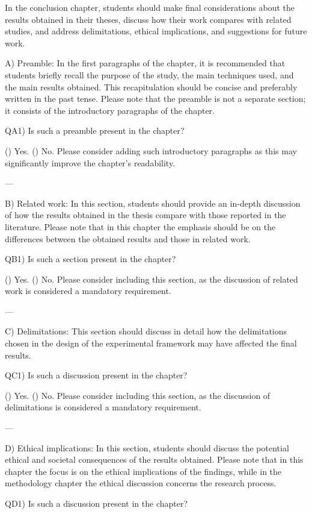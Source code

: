 In the conclusion chapter, students should make final considerations about the results obtained in their theses, discuss how their work compares with related studies, and address delimitations, ethical implications, and suggestions for future work.

A) Preamble: In the first paragraphs of the chapter, it is recommended that students briefly recall the purpose of the study, the main techniques used, and the main results obtained. This recapitulation should be concise and preferably written in the past tense. Please note that the preamble is not a separate section; it consists of the introductory paragraphs of the chapter.

QA1) Is such a preamble present in the chapter?

() Yes.  
() No. Please consider adding such introductory paragraphs as this may significantly improve the chapter's readability.

---

B) Related work: In this section, students should provide an in-depth discussion of how the results obtained in the thesis compare with those reported in the literature. Please note that in this chapter the emphasis should be on the differences between the obtained results and those in related work.

QB1) Is such a section present in the chapter?

() Yes.  
() No. Please consider including this section, as the discussion of related work is considered a mandatory requirement.

---

C) Delimitations: This section should discuss in detail how the delimitations chosen in the design of the experimental framework may have affected the final results. 

QC1) Is such a discussion present in the chapter?

() Yes.  
() No. Please consider including this section, as the discussion of delimitations is considered a mandatory requirement.

---

D) Ethical implications: In this section, students should discuss the potential ethical and societal consequences of the results obtained. Please note that in this chapter the focus is on the ethical implications of the findings, while in the methodology chapter the ethical discussion concerns the research process.

QD1) Is such a discussion present in the chapter?

